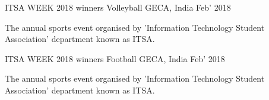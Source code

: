 

\begin{cventries}

  \cventry
    {ITSA WEEK 2018 winners} %
    {Volleyball} %
    {GECA, India} %
    {Feb' 2018} %
    {
     \begin{cvitems} %
        \item {The annual sports event organised by 'Information Technology Student Association' department known as ITSA.}
               {}
     \end{cvitems}
     }  

 \cventry
    {ITSA WEEK 2018 winners} %
    {Football} %
    {GECA, India} %
    {Feb' 2018} %
    {
    \begin{cvitems} %
        \item {The annual sports event organised by 'Information Technology Student Association' department known as ITSA.}
               {}
     \end{cvitems}
    }
    
\iffalse 
 \cventry
    {} %
    {Badminton} %
    {GECA, India} %
    {} %
    {}
\cventry
    {} %
    {Painting and Sketching} %
    {GECA, India} %
    {} %
    {}
\fi
\end{cventries}
